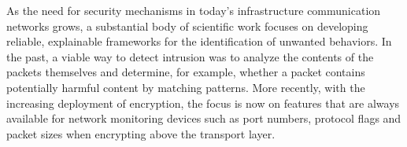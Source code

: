 \documentclass[conference]{IEEEtran}
\begin{document}
As the need for security mechanisms in today's infrastructure communication networks grows, a substantial body of scientific work focuses on developing reliable, explainable frameworks for the identification of unwanted behaviors. In the past, a viable way to detect intrusion was to analyze the contents of the packets themselves and determine, for example, whether a packet contains potentially harmful content by matching patterns. More recently, with the increasing deployment of encryption, the focus is now on features that are always available for network monitoring devices such as port numbers, protocol flags and packet sizes when encrypting above the transport layer.

\end{document}

